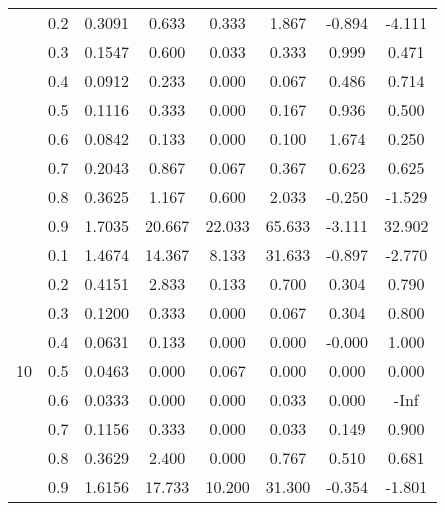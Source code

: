 \documentclass[11pt,a4paper]{report}
\begin{document}
\begin{longtable}{ | c | c || c | c | c | c | c | c | }
 & 0.2 & 0.3091 & 0.633 & 0.333 & 1.867 & -0.894 & -4.111 \\
 & 0.3 & 0.1547 & 0.600 & 0.033 & 0.333 & 0.999 & 0.471 \\
 & 0.4 & 0.0912 & 0.233 & 0.000 & 0.067 & 0.486 & 0.714 \\
 & 0.5 & 0.1116 & 0.333 & 0.000 & 0.167 & 0.936 & 0.500 \\
 & 0.6 & 0.0842 & 0.133 & 0.000 & 0.100 & 1.674 & 0.250 \\
 & 0.7 & 0.2043 & 0.867 & 0.067 & 0.367 & 0.623 & 0.625 \\
 & 0.8 & 0.3625 & 1.167 & 0.600 & 2.033 & -0.250 & -1.529 \\
 & 0.9 & 1.7035 & 20.667 & 22.033 & 65.633 & -3.111 & 32.902 \\
 \hline
\multirow{9}{*}{10} & 0.1 & 1.4674 & 14.367 & 8.133 & 31.633 & -0.897 & -2.770 \\
 & 0.2 & 0.4151 & 2.833 & 0.133 & 0.700 & 0.304 & 0.790 \\
 & 0.3 & 0.1200 & 0.333 & 0.000 & 0.067 & 0.304 & 0.800 \\
 & 0.4 & 0.0631 & 0.133 & 0.000 & 0.000 & -0.000 & 1.000 \\
 & 0.5 & 0.0463 & 0.000 & 0.067 & 0.000 & 0.000 & 0.000 \\
 & 0.6 & 0.0333 & 0.000 & 0.000 & 0.033 & 0.000 & -Inf \\
 & 0.7 & 0.1156 & 0.333 & 0.000 & 0.033 & 0.149 & 0.900 \\
 & 0.8 & 0.3629 & 2.400 & 0.000 & 0.767 & 0.510 & 0.681 \\
 & 0.9 & 1.6156 & 17.733 & 10.200 & 31.300 & -0.354 & -1.801 \\
 \hline
\hline
\end{longtable}
\end{document}
